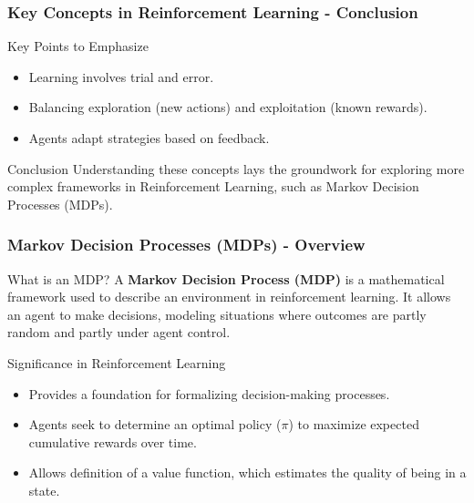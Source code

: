\documentclass[aspectratio=169]{beamer}
\begin{document}
\begin{frame}[fragile]
  \frametitle{Key Concepts in Reinforcement Learning - Conclusion}
  \begin{block}{Key Points to Emphasize}
    \begin{itemize}
      \item Learning involves trial and error.
      \item Balancing exploration (new actions) and exploitation (known rewards).
      \item Agents adapt strategies based on feedback.
    \end{itemize}
  \end{block}
  \begin{block}{Conclusion}
    Understanding these concepts lays the groundwork for exploring more complex frameworks in Reinforcement Learning, such as Markov Decision Processes (MDPs).
  \end{block}
\end{frame}

\begin{frame}[fragile]
    \frametitle{Markov Decision Processes (MDPs) - Overview}
    \begin{block}{What is an MDP?}
        A \textbf{Markov Decision Process (MDP)} is a mathematical framework used to describe an environment in reinforcement learning. It allows an agent to make decisions, modeling situations where outcomes are partly random and partly under agent control.
    \end{block}
    
    \begin{block}{Significance in Reinforcement Learning}
        \begin{itemize}
            \item Provides a foundation for formalizing decision-making processes.
            \item Agents seek to determine an optimal policy (\(\pi\)) to maximize expected cumulative rewards over time.
            \item Allows definition of a value function, which estimates the quality of being in a state.
        \end{itemize}
    \end{block}
\end{frame}
\end{document}
